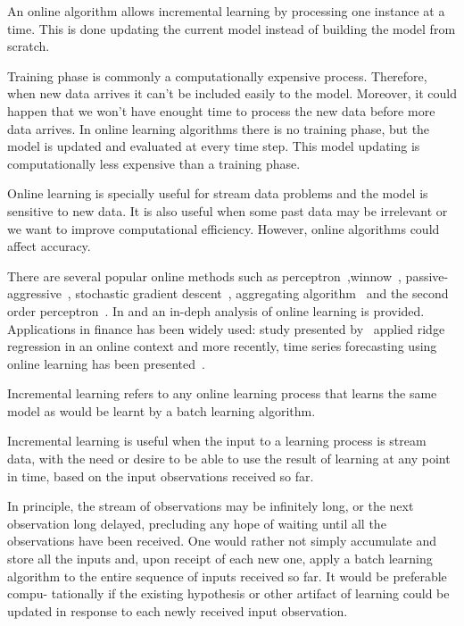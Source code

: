 An online algorithm allows incremental learning by processing one instance at a
time. This is done updating the current model instead of building the model from
scratch.

Training phase is commonly a computationally expensive process. Therefore, when
new data arrives it can't be included easily to the model. Moreover, it could
happen that we won't have enought time to process the new data before more data
arrives. In online learning algorithms there is no training phase, but the model
is updated and evaluated at every time step. This model updating is
computationally less expensive than a training phase.

Online learning is specially useful for stream data problems and the model is
sensitive to new data. It is also useful when some past data may be irrelevant
or we want to improve computational efficiency. However, online algorithms could
affect accuracy.

There are several popular online methods such as
perceptron~\cite{rosenblatt58},winnow~\cite{littlestone1988},
passive-aggressive~\cite{crammerETall2006}, stochastic gradient
descent~\cite{zhang2004}, aggregating algorithm~\cite{vovk2001} and the second
order perceptron~\cite{cesa-bianchi2005}.  In \cite{blum1998} and
\cite{cesa-bianchi2006} an in-deph analysis of online learning is provided.
Applications in finance has been widely used: study presented
by~\cite{arce+salinas2012} applied ridge regression in an online context and
more recently, time series forecasting using online learning has been
presented~\cite{anavaetAl2013}.

Incremental learning refers to any online learning process that learns the same
model as would be learnt by a batch learning algorithm. 

Incremental learning is useful when the input to a learning process is stream
data, with the need or desire to be able to use the result of learning at any
point in time, based on the input observations received so far. 

In principle, the stream of observations may be infinitely long, or the next
observation long delayed, precluding any hope of waiting until all the
observations have been received. One would rather not simply accumulate and
store all the inputs and, upon receipt of each new one, apply a batch learning
algorithm to the entire sequence of inputs received so far. It would be
preferable compu- tationally if the existing hypothesis or other artifact of
learning could be updated in response to each newly received input observation.

